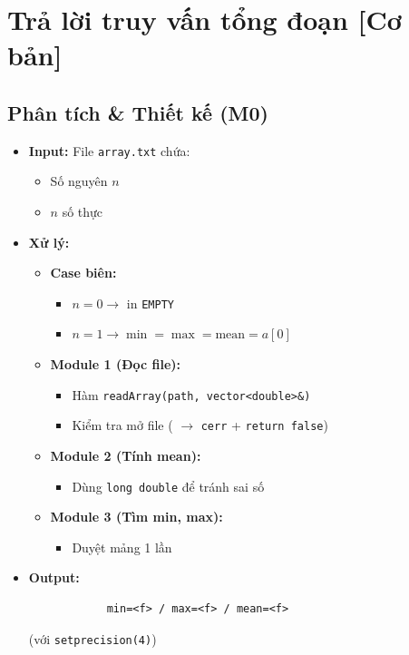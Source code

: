 \section{Trả lời truy vấn tổng đoạn [Cơ bản]}
\subsection{Phân tích \& Thiết kế (M0)}
    \begin{itemize}
    \item \textbf{Input:}
    File \texttt{array.txt} chứa:
    \begin{itemize}
        \item Số nguyên $n$
        \item $n$ số thực
    \end{itemize}

    \item \textbf{Xử lý:}
        \begin{itemize}
            \item \textbf{Case biên:}
            \begin{itemize}
                \item $n = 0 \rightarrow$ in \texttt{EMPTY}
                \item $n = 1 \rightarrow \min = \max = \text{mean} = a[0]$
            \end{itemize}
            
            \item \textbf{Module 1 (Đọc file):}
            \begin{itemize}
                \item Hàm \texttt{readArray(path, vector<double>\&)}
                \item Kiểm tra mở file ( $\rightarrow$ \texttt{cerr} + \texttt{return false})
            \end{itemize}
            
            \item \textbf{Module 2 (Tính mean):}
            \begin{itemize}
                \item Dùng \texttt{long double} để tránh sai số
            \end{itemize}
            
            \item \textbf{Module 3 (Tìm min, max):}
            \begin{itemize}
                \item Duyệt mảng 1 lần
            \end{itemize}
        \end{itemize}

        \item \textbf{Output:}
        \begin{lstlisting}
            min=<f> / max=<f> / mean=<f>\end{lstlisting} 
        (với \texttt{setprecision(4)})
    \end{itemize}

